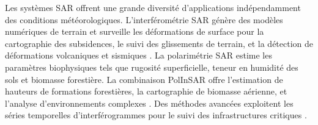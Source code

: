 Les systèmes SAR offrent une grande diversité d'applications indépendamment des conditions météorologiques. L'interférométrie SAR génère des modèles numériques de terrain et surveille les déformations de surface pour la cartographie des subsidences, le suivi des glissements de terrain, et la détection de déformations volcaniques et sismiques \cite{massonnet1998radar, rosen2000sar}. La polarimétrie SAR estime les paramètres biophysiques tels que rugosité superficielle, teneur en humidité des sols et biomasse forestière. La combinaison PolInSAR offre l'estimation de hauteurs de formations forestières, la cartographie de biomasse aérienne, et l'analyse d'environnements complexes \cite{papathanassiou2001single, cloude1998polarimetric}. Des méthodes avancées exploitent les séries temporelles d'interférogrammes pour le suivi des infrastructures critiques \cite{berardino2002new, hooper2007persistent}.